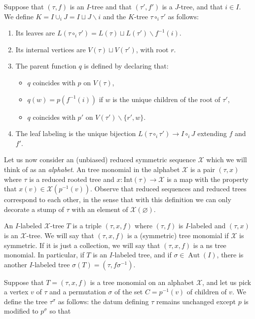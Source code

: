 \documentclass[fleqn,a4paper, twoside]{article}
\newcommand{\0}{\langle 0\rangle}
\newcommand{\XX}{\mathcal{X}}
\newenvironment{tenumerate}{
 \begin{enumerate}
  \setlength{\itemsep}{0pt}
  \setlength{\parskip}{0pt}
}{\end{enumerate}}
\newenvironment{titemize}{
\begin{itemize}
  \setlength{\itemsep}{0pt}
  \setlength{\parskip}{0pt}
}{\end{itemize}}
\DeclareRobustCommand{\[}{\begin{equation}}%
\DeclareRobustCommand{\]}{\end{equation}}%
\theoremstyle{mytheorem}
\theoremstyle{introthm}
\theoremstyle{mydefinition}
\theoremstyle{mydefinition2}
\theoremstyle{plain} %
\newcommand{\?}{\,?\,}
\newcommand{\Aut}{\operatorname{Aut}}
\theoremstyle{mytheorem}
\theoremstyle{plain} %
\begin{document}
Suppose that $(\tau,f)$ is an $I$-tree and that
$(\tau',f')$ is a $J$-tree, and that $i\in I$. We define
$K=I\cup_i J = I\sqcup J \smallsetminus i$ and the
$K$-tree $\tau\circ_i \tau'$ as follows:
\begin{tenumerate}
\item Its leaves are $L(\tau\circ_i \tau') = L(\tau)\sqcup L(\tau')\smallsetminus f^{-1}(i)$.
\item Its internal vertices are $V(\tau)\sqcup V(\tau')$, with
root $r$. 
\item The parent function $q$ is defined by declaring that:
	\begin{titemize} 
	\item $q$ coincides with $p$ on $V(\tau)$, 
	\item $q(w) = p(f^{-1}(i))$ if
$w$ is the unique children of the root of $\tau'$, 
	\item  $q$
coincides with $p'$ on $V(\tau')\smallsetminus \{r',w\}$.
\end{titemize}
\item The leaf labeling is the unique bijection $L(\tau\circ_i \tau') \longrightarrow I\circ_i J$ extending $f$ and $f'$.
\end{tenumerate} 
Let us now consider an 
(unbiased) reduced symmetric sequence $\XX$ which
we will think of as an \emph{alphabet}. An tree monomial in the
alphabet $\XX$ 
is a pair $(\tau,x)$ where $\tau$ is a reduced rooted
tree and $x : \mathrm{Int}(\tau) \longrightarrow \XX$ is a map
with the property that $x(v) \in \XX(p^{-1}(v))$. Observe that
reduced sequences and reduced trees correspond to each other, in the
sense that with this definition we can only decorate a stump
of $\tau$ with an element of $\XX(\varnothing)$. 

An $I$-labeled
$\XX$-tree $T$ is a triple $(\tau,x,f)$ where $(\tau,f)$ is $I$-labeled
and $(\tau,x)$ is an $\XX$-tree. We will say that $(\tau,x,f)$
is a (symmetric) tree monomial if $\XX$ is symmetric. If it
is just a collection, we will say that $(\tau,x,f)$ is a
ns tree monomial. In particular, if $T$ is an $I$-labeled
tree, and if $\sigma \in \Aut(I)$, there is another 
$I$-labeled tree $\sigma(T)=(\tau,f\sigma^{-1})$. 


Suppose that $T = (\tau,x,f)$ is a tree monomial on an
alphabet $\XX$, and let us pick a vertex $v$ of $\tau$
and a permutation $\sigma$ of the set $C = p^{-1}(v)$ of
children of $v$. We define the tree $\tau^\sigma$ as
follows: the datum defining $\tau$ remains unchanged
except $p$ is modified to $p^\sigma$ so that 
\end{document}
